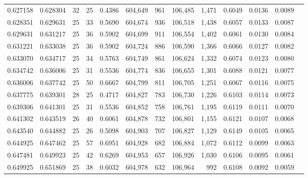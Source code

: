\begin{tabular}{rrrrrrrrrrrrr}
0.627158 & 0.628304 &    32 &  25 &                                     0.4386 & 604,649 &     961 & 106,485 &   1,471 & 0.6049 & 0.0136 & 0.0089 \\
0.628351 & 0.629631 &    25 &  33 &                                     0.5690 & 604,674 &     936 & 106,518 &   1,438 & 0.6057 & 0.0133 & 0.0087 \\
0.629631 & 0.631217 &    25 &  36 &                                     0.5902 & 604,699 &     911 & 106,554 &   1,402 & 0.6061 & 0.0130 & 0.0084 \\
0.631221 & 0.633038 &    25 &  36 &                                     0.5902 & 604,724 &     886 & 106,590 &   1,366 & 0.6066 & 0.0127 & 0.0082 \\
0.633070 & 0.634717 &    25 &  34 &                                     0.5763 & 604,749 &     861 & 106,624 &   1,332 & 0.6074 & 0.0123 & 0.0080 \\
0.634742 & 0.636006 &    25 &  31 &                                     0.5536 & 604,774 &     836 & 106,655 &   1,301 & 0.6088 & 0.0121 & 0.0077 \\
0.636006 & 0.637742 &    25 &  50 &                                     0.6667 & 604,799 &     811 & 106,705 &   1,251 & 0.6067 & 0.0116 & 0.0075 \\
0.637775 & 0.639301 &    28 &  25 &                                     0.4717 & 604,827 &     783 & 106,730 &   1,226 & 0.6103 & 0.0114 & 0.0073 \\
0.639306 & 0.641301 &    25 &  31 &                                     0.5536 & 604,852 &     758 & 106,761 &   1,195 & 0.6119 & 0.0111 & 0.0070 \\
0.641302 & 0.643519 &    26 &  40 &                                     0.6061 & 604,878 &     732 & 106,801 &   1,155 & 0.6121 & 0.0107 & 0.0068 \\
0.643540 & 0.644882 &    25 &  26 &                                     0.5098 & 604,903 &     707 & 106,827 &   1,129 & 0.6149 & 0.0105 & 0.0065 \\
0.644925 & 0.647462 &    25 &  57 &                                     0.6951 & 604,928 &     682 & 106,884 &   1,072 & 0.6112 & 0.0099 & 0.0063 \\
0.647481 & 0.649923 &    25 &  42 &                                     0.6269 & 604,953 &     657 & 106,926 &   1,030 & 0.6106 & 0.0095 & 0.0061 \\
0.649925 & 0.651869 &    25 &  38 &                                     0.6032 & 604,978 &     632 & 106,964 &     992 & 0.6108 & 0.0092 & 0.0059 \\

\end{tabular}
